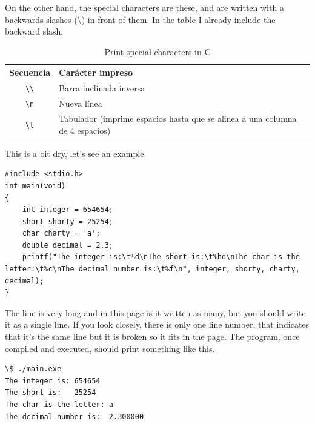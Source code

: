 \documentclass[a4paper]{article}
\begin{document}
On the other hand, the special characters are these, and are written with a
backwards slashes (\textbackslash{}) in front of them. In the table I already
include the backward slash.

\begin{table}[H]
\centering
\begin{tabularx}{\linewidth}{|c|Y|}
\hline
\textbf{Secuencia} & \textbf{Carácter impreso}                                                           \\\hline
\texttt{\textbackslash{}\textbackslash{}} & Barra inclinada inversa                                      \\\hline
\texttt{\textbackslash{}n}& Nueva línea                                                                  \\\hline
\texttt{\textbackslash{}t}& Tabulador (imprime espacios hasta que se alinea a una columna de 4 espacios) \\\hline
\end{tabularx}
\caption{Print special characters in C}
\label{tab:specialCharsC}
\end{table}

This is a bit dry, let's see an example.

\noindent
\begin{minipage}[H]{\linewidth}
\mbox{}
\begin{lstlisting}[style=C, caption={Ejemplo de impresión.},
label={lst:decimalvsintergerDivision}]
#include <stdio.h>
int main(void)
{
    int integer = 654654;
    short shorty = 25254;
    char charty = 'a';
    double decimal = 2.3;
    printf("The integer is:\t%d\nThe short is:\t%hd\nThe char is the letter:\t%c\nThe decimal number is:\t%f\n", integer, shorty, charty, decimal);
}
\end{lstlisting}
\end{minipage}

The line is very long and in this page is it written as many, but you should
write it as a single line. If you look closely, there is only one line number,
that indicates that it's the same line but it is broken so it fits in the page.
The program, once compiled and executed, should print something like this.

\noindent
\begin{minipage}[H]{\linewidth}
\mbox{}
\begin{lstlisting}[style=terminalStyle]
\$ ./main.exe
The integer is: 654654
The short is:   25254
The char is the letter: a
The decimal number is:  2.300000
\end{lstlisting}
\end{minipage}
\end{document}
